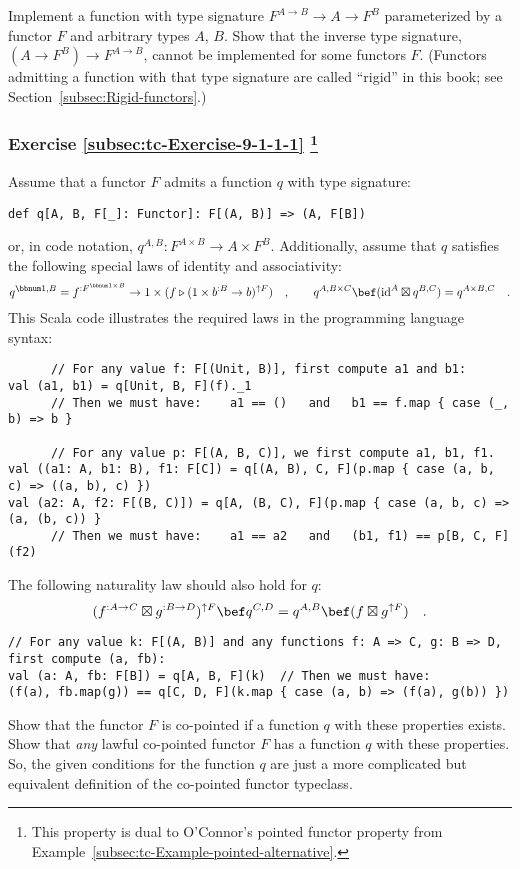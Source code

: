 Implement a function with type signature $F^{A\rightarrow B}\rightarrow A\rightarrow F^{B}$
parameterized by a functor $F$ and arbitrary types $A$, $B$. Show
that the inverse type signature, $(A\rightarrow F^{B})\rightarrow F^{A\rightarrow B}$,
cannot be implemented for some functors $F$. (Functors admitting
a function with that type signature are called \textsf{``}rigid\textsf{''}
in this book; see Section~\ref{subsec:Rigid-functors}.)

\subsubsection{Exercise \label{subsec:tc-Exercise-9-1-1-1}\ref{subsec:tc-Exercise-9-1-1-1}
\protect\footnote{This property is dual to O\textsf{'}Connor\textsf{'}s pointed functor property from
Example~\ref{subsec:tc-Example-pointed-alternative}.}}

Assume that a functor $F$ admits a function
$q$ with type signature:
\begin{lstlisting}
def q[A, B, F[_]: Functor]: F[(A, B)] => (A, F[B])
\end{lstlisting}
or, in code notation, $q^{A,B}:F^{A\times B}\rightarrow A\times F^{B}$.
Additionally, assume that $q$ satisfies the following special laws
of identity and associativity:
\[
q^{\bbnum 1,B}=f^{:F^{\bbnum 1\times B}}\rightarrow1\times(f\triangleright(1\times b^{:B}\rightarrow b)^{\uparrow F})\quad,\quad\quad q^{A,B\times C}\bef(\text{id}^{A}\boxtimes q^{B,C})=q^{A\times B,C}\quad.
\]
This Scala code illustrates the required laws in the programming language
syntax:
\begin{lstlisting}
      // For any value f: F[(Unit, B)], first compute a1 and b1:
val (a1, b1) = q[Unit, B, F](f)._1
      // Then we must have:    a1 == ()   and   b1 == f.map { case (_, b) => b }

      // For any value p: F[(A, B, C)], we first compute a1, b1, f1.
val ((a1: A, b1: B), f1: F[C]) = q[(A, B), C, F](p.map { case (a, b, c) => ((a, b), c) })
val (a2: A, f2: F[(B, C)]) = q[A, (B, C), F](p.map { case (a, b, c) => (a, (b, c)) }
      // Then we must have:    a1 == a2   and   (b1, f1) == p[B, C, F](f2)
\end{lstlisting}
The following naturality law should also hold for $q$:
\[
(f^{:A\rightarrow C}\boxtimes g^{:B\rightarrow D})^{\uparrow F}\bef q^{C,D}=q^{A,B}\bef(f\boxtimes g^{\uparrow F})\quad.
\]
\begin{lstlisting}
// For any value k: F[(A, B)] and any functions f: A => C, g: B => D, first compute (a, fb):
val (a: A, fb: F[B]) = q[A, B, F](k)  // Then we must have:
(f(a), fb.map(g)) == q[C, D, F](k.map { case (a, b) => (f(a), g(b)) })
\end{lstlisting}
Show that the functor $F$ is co-pointed if a function $q$ with these
properties exists. Show that \emph{any} lawful co-pointed functor
$F$ has a function $q$ with these properties. So, the given conditions
for the function $q$ are just a more complicated but equivalent definition
of the co-pointed functor typeclass.

